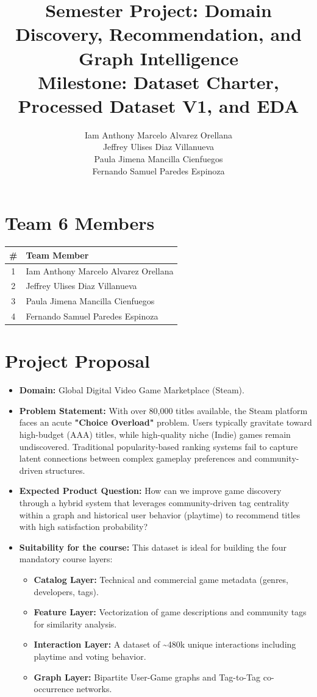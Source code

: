 \documentclass[11pt,a4paper]{article}
\title{Semester Project: Domain Discovery, Recommendation, and Graph Intelligence\\
\large Milestone: Dataset Charter, Processed Dataset V1, and EDA}
\author{Iam Anthony Marcelo Alvarez Orellana \\ Jeffrey Ulises Diaz Villanueva \\ Paula Jimena Mancilla Cienfuegos \\ Fernando Samuel Paredes Espinoza}
\date{}
\begin{document}
\maketitle
\onehalfspacing

\section*{Team 6 Members}
\begin{center}
\begin{tabular}{cl}
\toprule
\textbf{\#} & \textbf{Team Member} \\
\midrule
1 & Iam Anthony Marcelo Alvarez Orellana \\
2 & Jeffrey Ulises Diaz Villanueva \\
3 & Paula Jimena Mancilla Cienfuegos \\
4 & Fernando Samuel Paredes Espinoza \\
\bottomrule
\end{tabular}
\end{center}

\section{Project Proposal}
\begin{itemize}[leftmargin=*]
  \item \textbf{Domain:} Global Digital Video Game Marketplace (Steam).
  \item \textbf{Problem Statement:} With over 80,000 titles available, the Steam platform faces an acute \textbf{"Choice Overload"} problem. Users typically gravitate toward high-budget (AAA) titles, while high-quality niche (Indie) games remain undiscovered. Traditional popularity-based ranking systems fail to capture latent connections between complex gameplay preferences and community-driven structures.
  \item \textbf{Expected Product Question:} How can we improve game discovery through a hybrid system that leverages community-driven tag centrality within a graph and historical user behavior (playtime) to recommend titles with high satisfaction probability?
  \item \textbf{Suitability for the course:} This dataset is ideal for building the four mandatory course layers:
  \begin{itemize}[leftmargin=*]
    \item \textbf{Catalog Layer:} Technical and commercial game metadata (genres, developers, tags).
    \item \textbf{Feature Layer:} Vectorization of game descriptions and community tags for similarity analysis.
    \item \textbf{Interaction Layer:} A dataset of \textasciitilde 480k unique interactions including playtime and voting behavior.
    \item \textbf{Graph Layer:} Bipartite User-Game graphs and Tag-to-Tag co-occurrence networks.
  \end{itemize}
\end{itemize}
\end{document}
